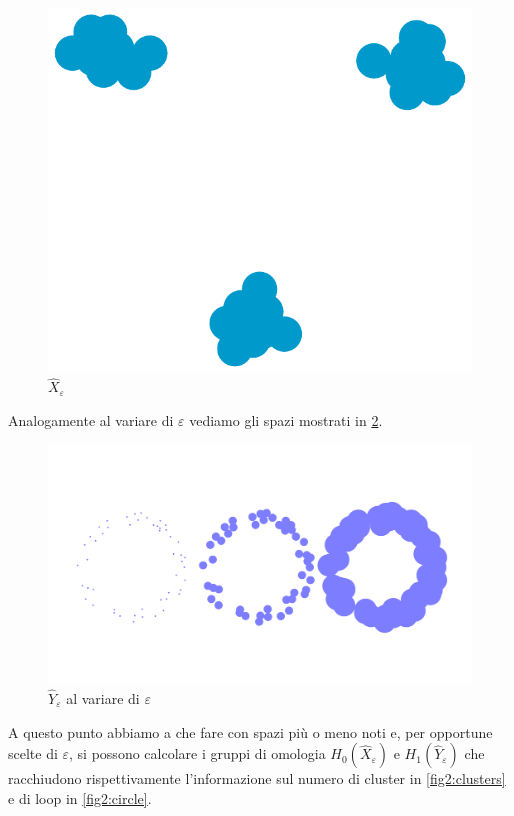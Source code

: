 \begin{figure}[h]
  \begin{center}
    \includegraphics[width=.4\linewidth]{gfx/three_clusters_fat.pdf}
    \caption{$\widehat{X}_\varepsilon$}
    \label{fig2:clusters_fat}
  \end{center}
\end{figure}

Analogamente al variare di $\varepsilon$ vediamo gli spazi mostrati in \cref{fig2:circlecomparison}.

\begin{figure}[h]
  \begin{center}
    \includegraphics[width=.7\paperwidth]{gfx/statistical_circle_comparison.pdf}
    \caption{$\widehat{Y}_\varepsilon$ al variare di $\varepsilon$}
    \label{fig2:circlecomparison}
  \end{center}
\end{figure}

A questo punto abbiamo a che fare con spazi più o meno noti e, per opportune scelte di $\varepsilon$, si possono calcolare i gruppi di omologia $H_0(\widehat{X}_\varepsilon)$ e $H_1(\widehat{Y}_\varepsilon)$ che racchiudono rispettivamente l'informazione sul numero di cluster in \cref{fig2:clusters} e di loop in \cref{fig2:circle}.

